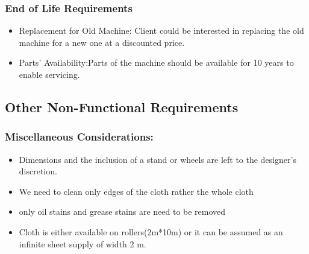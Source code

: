 \documentclass[table]{rapportCS}
\begin{document}
  \subsubsection{ End of Life Requirements}\label{sec: endoflifereq}
    \begin{itemize}[label=$\bullet$]
      \item Replacement for Old Machine: Client could be interested in replacing the old machine for a new one at a discounted price.
      \item Parts' Availability:Parts of the machine should be available for 10 years to enable servicing.
    \end{itemize}
    


\subsection{Other Non-Functional Requirements}\label{sec:otherreq}
\subsubsection{Miscellaneous Considerations:}\label{sec:misccons}
    \begin{itemize}[label=$\bullet$]
      \item Dimensions and the inclusion of a stand or wheels are left to the designer's discretion.
      \item We need to clean only edges of the cloth rather the whole cloth
      \item only oil stains and grease stains are need to be removed
      \item Cloth is either available on rollers(2m*10m) or it can be assumed as an infinite sheet supply of width 2 m.

    \end{itemize}
\clearpage
\end{document}
